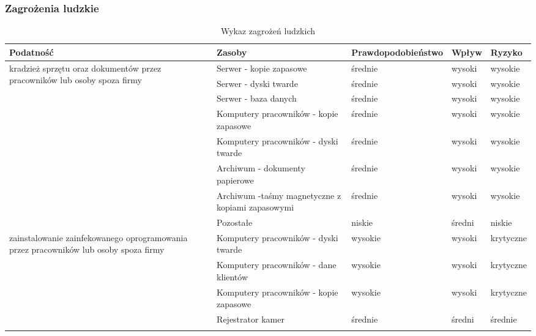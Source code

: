 \subsubsection{Zagrożenia ludzkie}

\begin{landscape}
\begin{longtable}[!ht]{|m{4cm}|m{6cm}|m{4.5cm}|m{3cm}|m{3cm}|}
	\caption{Wykaz zagrożeń ludzkich}
	\label{tab::zagrozenia_ludzkie} \\
		\hline
		\textbf{Podatność} & \textbf{Zasoby} & \textbf{Prawdopodobieństwo} & \textbf{Wpływ} &  \textbf{Ryzyko} \\ \hline
		\multirow{8}{4cm}{kradzież sprzętu oraz dokumentów przez pracowników lub osoby spoza firmy}             & Serwer - kopie zapasowe                           & średnie            & wysoki & wysokie       \\ \cline{2-5} 
		& Serwer - dyski twarde                             & średnie            & wysoki & wysokie       \\ \cline{2-5} 
		& Serwer - baza danych                              & średnie            & wysoki & wysokie       \\ \cline{2-5} 
		& Komputery pracowników - kopie zapasowe            & średnie            & wysoki & wysokie       \\ \cline{2-5} 
		& Komputery pracowników - dyski twarde              & średnie            & wysoki & wysokie       \\ \cline{2-5} 
		& Archiwum - dokumenty papierowe                    & średnie            & wysoki & wysokie       \\ \cline{2-5} 
		& Archiwum -taśmy magnetyczne z kopiami zapasowymi  & średnie            & wysoki & wysokie       \\ \cline{2-5} 
		& Pozostałe                                         & niskie             & średni & niskie        \\ \hline
		\multirow{7}{4cm}{zainstalowanie zainfekowanego oprogramowania przez pracowników lub osoby spoza firmy} & Komputery pracowników - dyski twarde              & wysokie            & wysoki & krytyczne     \\ \cline{2-5} 
		& Komputery pracowników - dane klientów             & wysokie            & wysoki & krytyczne     \\ \cline{2-5} 
		& Komputery pracowników - kopie zapasowe            & wysokie            & wysoki & krytyczne     \\ \cline{2-5} 
		& Rejestrator kamer                                 & średnie            & średni & średnie       \\ \cline{2-5} 

\end{longtable}
\end{landscape}
